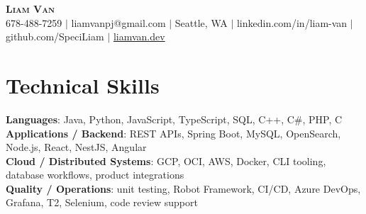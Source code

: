 \documentclass[letterpaper,11pt]{article}
\begin{document}

%
\begin{center}
    \textbf{\Huge \scshape Liam Van} \\ \vspace{1pt}
    \small 678-488-7259 $|$ \small {liamvanpj@gmail.com} $|$ Seattle, WA
 {{$|$ linkedin.com/in/liam-van} {$|$ github.com/SpeciLiam} {$|$ \href{https://liamvan.dev}{liamvan.dev}}}

\end{center}

\section{Technical Skills}
 \begin{itemize}[leftmargin=0.15in, label={}]
    \small{\item{
     \textbf{Languages}{: Java, Python, JavaScript, TypeScript, SQL, C++, C\#, PHP, C} \\
     \textbf{Applications / Backend}{: REST APIs, Spring Boot, MySQL, OpenSearch, Node.js, React, NestJS, Angular} \\
     \textbf{Cloud / Distributed Systems}{: GCP, OCI, AWS, Docker, CLI tooling, database workflows, product integrations} \\
     \textbf{Quality / Operations}{: unit testing, Robot Framework, CI/CD, Azure DevOps, Grafana, T2, Selenium, code review support} \\
    }}
 \end{itemize}
%

\end{document}
